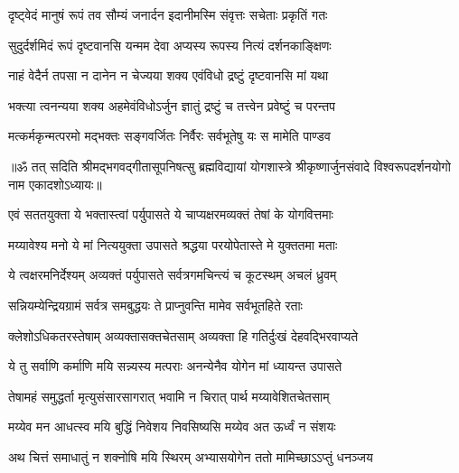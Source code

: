 
\twolineshloka
{दृष्ट्वेदं मानुषं रूपं तव सौम्यं जनार्दन}
{इदानीमस्मि संवृत्तः सचेताः प्रकृतिं गतः}%


\twolineshloka
{सुदुर्दर्शमिदं रूपं दृष्टवानसि यन्मम}
{देवा अप्यस्य रूपस्य नित्यं दर्शनकाङ्क्षिणः}%

\twolineshloka
{नाहं वेदैर्न तपसा न दानेन न चेज्यया}
{शक्य एवंविधो द्रष्टुं दृष्टवानसि मां यथा}%

\twolineshloka
{भक्त्या त्वनन्यया शक्य अहमेवंविधोऽर्जुन}
{ज्ञातुं द्रष्टुं च तत्त्वेन प्रवेष्टुं च परन्तप}%

\twolineshloka
{मत्कर्मकृन्मत्परमो मद्भक्तः सङ्गवर्जितः}
{निर्वैरः सर्वभूतेषु यः स मामेति पाण्डव}%

{॥ॐ तत् सदिति श्रीमद्भगवद्गीतासूपनिषत्सु ब्रह्मविद्यायां योगशास्त्रे श्रीकृष्णार्जुनसंवादे विश्वरूपदर्शनयोगो नाम एकादशोऽध्यायः॥}



\twolineshloka
{एवं सततयुक्ता ये भक्तास्त्वां पर्युपासते}
{ये चाप्यक्षरमव्यक्तं तेषां के योगवित्तमाः}%


\twolineshloka
{मय्यावेश्य मनो ये मां नित्ययुक्ता उपासते}
{श्रद्धया परयोपेतास्ते मे युक्ततमा मताः}%

\twolineshloka
{ये त्वक्षरमनिर्देश्यम् अव्यक्तं पर्युपासते}
{सर्वत्रगमचिन्त्यं च कूटस्थम् अचलं ध्रुवम्}%

\twolineshloka
{सन्नियम्येन्द्रियग्रामं सर्वत्र समबुद्धयः}
{ते प्राप्नुवन्ति मामेव सर्वभूतहिते रताः}%

\twolineshloka
{क्लेशोऽधिकतरस्तेषाम् अव्यक्तासक्तचेतसाम्}
{अव्यक्ता हि गतिर्दुःखं देहवद्भिरवाप्यते}%

\twolineshloka
{ये तु सर्वाणि कर्माणि मयि सन्न्यस्य मत्पराः}
{अनन्येनैव योगेन मां ध्यायन्त उपासते}%

\twolineshloka
{तेषामहं समुद्धर्ता मृत्युसंसारसागरात्}
{भवामि न चिरात् पार्थ मय्यावेशितचेतसाम्}%

\twolineshloka
{मय्येव मन आधत्स्व मयि बुद्धिं निवेशय}
{निवसिष्यसि मय्येव अत ऊर्ध्वं न संशयः}%

\twolineshloka
{अथ चित्तं समाधातुं न शक्नोषि मयि स्थिरम्}
{अभ्यासयोगेन ततो मामिच्छाऽऽप्तुं धनञ्जय}%

